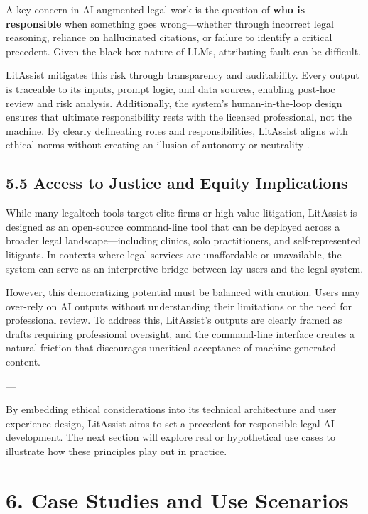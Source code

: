 \documentclass[12pt,a4paper]{article}
\begin{document}
A key concern in AI-augmented legal work is the question of \textbf{who is responsible} when something goes wrong—whether through incorrect legal reasoning, reliance on hallucinated citations, or failure to identify a critical precedent. Given the black-box nature of LLMs, attributing fault can be difficult.

LitAssist mitigates this risk through transparency and auditability. Every output is traceable to its inputs, prompt logic, and data sources, enabling post-hoc review and risk analysis. Additionally, the system's human-in-the-loop design ensures that ultimate responsibility rests with the licensed professional, not the machine. By clearly delineating roles and responsibilities, LitAssist aligns with ethical norms without creating an illusion of autonomy or neutrality \cite{Winfield2021}.

\subsection*{5.5 Access to Justice and Equity Implications}

While many legaltech tools target elite firms or high-value litigation, LitAssist is designed as an open-source command-line tool that can be deployed across a broader legal landscape—including clinics, solo practitioners, and self-represented litigants. In contexts where legal services are unaffordable or unavailable, the system can serve as an interpretive bridge between lay users and the legal system.

However, this democratizing potential must be balanced with caution. Users may over-rely on AI outputs without understanding their limitations or the need for professional review. To address this, LitAssist's outputs are clearly framed as drafts requiring professional oversight, and the command-line interface creates a natural friction that discourages uncritical acceptance of machine-generated content.

---

By embedding ethical considerations into its technical architecture and user experience design, LitAssist aims to set a precedent for responsible legal AI development. The next section will explore real or hypothetical use cases to illustrate how these principles play out in practice.

\section*{6. Case Studies and Use Scenarios}
\end{document}
